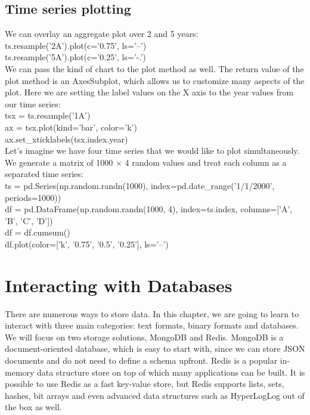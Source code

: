 \documentclass{article}
\numberwithin{equation}{section} %
\begin{document}
\subsection*{Time series plotting}

We can overlay an aggregate plot over 2 and 5 years: \\

ts.resample('2A').plot(c='0.75', ls='--') \\

ts.resample('5A').plot(c='0.25', ls='-.') \\

We can pass the kind of chart to the plot method as well. The return value of the
plot method is an AxesSubplot, which allows us to customize many aspects of the
plot. Here we are setting the label values on the X axis to the year values from our
time series: \\

tsx = ts.resample('1A') \\

ax = tsx.plot(kind='bar', color='k') \\

ax.set\_xticklabels(tsx.index.year) \\

Let's imagine we have four time series that we would like to plot simultaneously. We generate a matrix of 1000 $\times$ 4 random values and treat each column as a separated time series: \\

ts = pd.Series(np.random.randn(1000), index=pd.date\_range('1/1/2000', periods=1000)) \\
df = pd.DataFrame(np.random.randn(1000, 4), index=ts.index, columns=['A', 'B', 'C', 'D']) \\

df = df.cumsum() \\

df.plot(color=['k', '0.75', '0.5', '0.25'], ls='--') \\


\section{Interacting with Databases}

There are numerous ways to store data. In this chapter, we are going to learn to
interact with three main categories: text formats, binary formats and databases. We
will focus on two storage solutions, MongoDB and Redis. MongoDB is a document-oriented database, which is easy to start with, since we can store JSON documents and do not need to define a schema upfront. Redis is a popular in-memory data structure store on top of which many applications can be built. It is possible to use Redis as a fast key-value store, but Redis supports lists, sets, hashes, bit arrays and even advanced data structures such as HyperLogLog out of the box as well. \\
\end{document}
